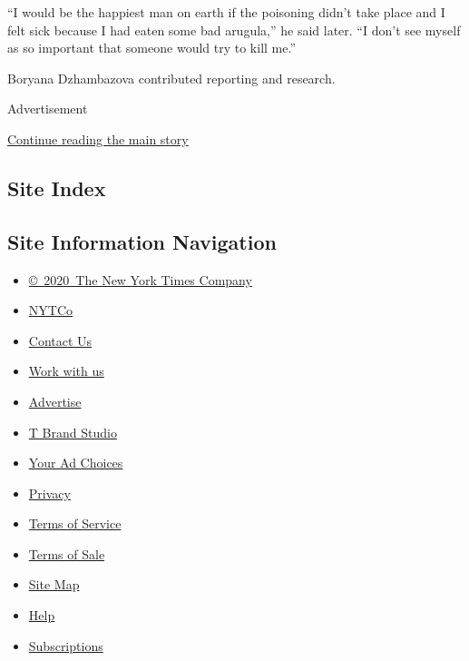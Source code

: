 ``I would be the happiest man on earth if the poisoning didn't take
place and I felt sick because I had eaten some bad arugula,'' he said
later. ``I don't see myself as so important that someone would try to
kill me.''

Boryana Dzhambazova contributed reporting and research.

Advertisement

\protect\hyperlink{after-bottom}{Continue reading the main story}

\hypertarget{site-index}{%
\subsection{Site Index}\label{site-index}}

\hypertarget{site-information-navigation}{%
\subsection{Site Information
Navigation}\label{site-information-navigation}}

\begin{itemize}
\tightlist
\item
  \href{https://help.nytimes.com/hc/en-us/articles/115014792127-Copyright-notice}{©~2020~The
  New York Times Company}
\end{itemize}

\begin{itemize}
\tightlist
\item
  \href{https://www.nytco.com/}{NYTCo}
\item
  \href{https://help.nytimes.com/hc/en-us/articles/115015385887-Contact-Us}{Contact
  Us}
\item
  \href{https://www.nytco.com/careers/}{Work with us}
\item
  \href{https://nytmediakit.com/}{Advertise}
\item
  \href{http://www.tbrandstudio.com/}{T Brand Studio}
\item
  \href{https://www.nytimes.com/privacy/cookie-policy\#how-do-i-manage-trackers}{Your
  Ad Choices}
\item
  \href{https://www.nytimes.com/privacy}{Privacy}
\item
  \href{https://help.nytimes.com/hc/en-us/articles/115014893428-Terms-of-service}{Terms
  of Service}
\item
  \href{https://help.nytimes.com/hc/en-us/articles/115014893968-Terms-of-sale}{Terms
  of Sale}
\item
  \href{https://spiderbites.nytimes.com}{Site Map}
\item
  \href{https://help.nytimes.com/hc/en-us}{Help}
\item
  \href{https://www.nytimes.com/subscription?campaignId=37WXW}{Subscriptions}
\end{itemize}
